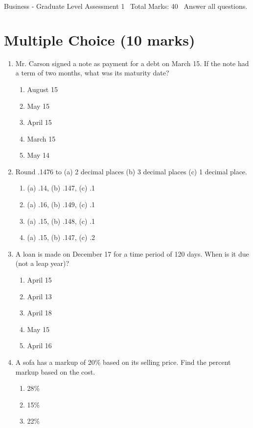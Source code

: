 \documentclass[12pt]{article}
\begin{document}
\begin{center}
Business - Graduate Level Assessment 1 \
Total Marks: 40 \
Answer all questions.
\end{center}

\section*{Multiple Choice (10 marks)}
\begin{enumerate}[label=\arabic*.]
\item Mr. Carson signed a note as payment for a debt on March 15. If the note had a term of two
months, what was its maturity date?
\begin{enumerate}[label=(\alph*)]
    \item August 15
    \item May 15
    \item April 15
    \item March 15
    \item May 14
\end{enumerate}
\item Round .1476 to (a) 2 decimal places (b) 3 decimal places (c) 1 decimal place.
\begin{enumerate}[label=(\alph*)]
    \item (a) .14, (b) .147, (c) .1
    \item (a) .16, (b) .149, (c) .1
    \item (a) .15, (b) .148, (c) .1
    \item (a) .15, (b) .147, (c) .2
\end{enumerate}
\item A loan is made on December 17 for a time period of 120 days. When is it due (not a leap
year)?
\begin{enumerate}[label=(\alph*)]
    \item April 15
    \item April 13
    \item April 18
    \item May 15
    \item April 16
\end{enumerate}
\item A sofa has a markup of 20\% based on its selling price. Find the percent markup based on
the cost.
\begin{enumerate}[label=(\alph*)]
    \item 28\%
    \item 15\%
    \item 22\%

\end{enumerate}
\end{enumerate}
\end{document}
